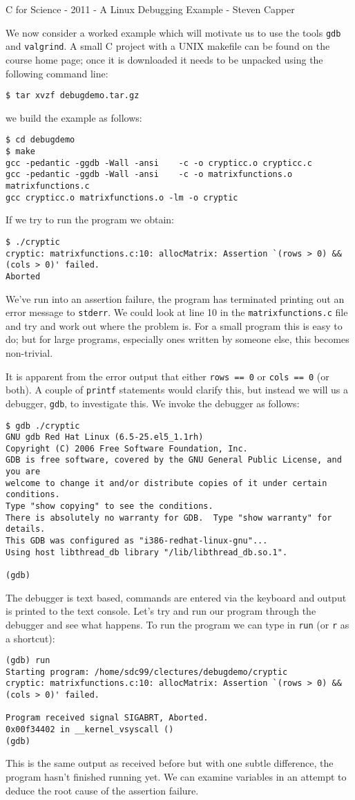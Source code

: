 \documentclass[a4paper,12pt]{article}
\begin{document}
\begin{center}
\large C for Science - 2011 - A Linux Debugging Example - Steven Capper
\end{center}
We now consider a worked example which will motivate us to use the tools {\tt gdb} and {\tt valgrind}. A small C project with a UNIX makefile can be found on the course home page; once it is downloaded it needs to be unpacked using the following command line:
\begin{verbatim}
$ tar xvzf debugdemo.tar.gz
\end{verbatim} 
we build the example as follows:
\begin{verbatim}
$ cd debugdemo
$ make
gcc -pedantic -ggdb -Wall -ansi    -c -o crypticc.o crypticc.c
gcc -pedantic -ggdb -Wall -ansi    -c -o matrixfunctions.o matrixfunctions.c
gcc crypticc.o matrixfunctions.o -lm -o cryptic
\end{verbatim}
If we try to run the program we obtain:
\begin{verbatim}
$ ./cryptic 
cryptic: matrixfunctions.c:10: allocMatrix: Assertion `(rows > 0) && (cols > 0)' failed.
Aborted
\end{verbatim}
We've run into an assertion failure, the program has terminated printing out an error message to {\tt stderr}. We could look at line 10 in the {\tt matrixfunctions.c} file and try and work out where the problem is. For a small program this is easy to do; but for large programs, especially ones written by someone else, this becomes non-trivial.

It is apparent from the error output that either {\tt rows == 0} or {\tt cols == 0} (or both). A couple of {\tt printf} statements would clarify this, but instead we will us a debugger, {\tt gdb}, to investigate this. We invoke the debugger as follows:
\begin{verbatim}
$ gdb ./cryptic
GNU gdb Red Hat Linux (6.5-25.el5_1.1rh)
Copyright (C) 2006 Free Software Foundation, Inc.
GDB is free software, covered by the GNU General Public License, and you are
welcome to change it and/or distribute copies of it under certain conditions.
Type "show copying" to see the conditions.
There is absolutely no warranty for GDB.  Type "show warranty" for details.
This GDB was configured as "i386-redhat-linux-gnu"...
Using host libthread_db library "/lib/libthread_db.so.1".

(gdb) 
\end{verbatim}
The debugger is text based, commands are entered via the keyboard and output is printed to the text console. Let's try and run our program through the debugger and see what happens. To run the program we can type in {\tt run} (or {\tt r} as a shortcut):
\begin{verbatim}
(gdb) run 
Starting program: /home/sdc99/clectures/debugdemo/cryptic 
cryptic: matrixfunctions.c:10: allocMatrix: Assertion `(rows > 0) && (cols > 0)' failed.

Program received signal SIGABRT, Aborted.
0x00f34402 in __kernel_vsyscall ()
(gdb) 
\end{verbatim}
This is the same output as received before but with one subtle difference, the program hasn't finished running yet. We can examine variables in an attempt to deduce the root cause of the assertion failure.
\end{document}
